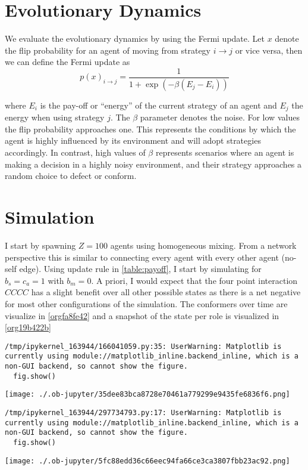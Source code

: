 \documentclass[a4paper, 11pt, twocolumn]{article}
\begin{document}
\section{Evolutionary Dynamics}
\label{sec:orgf5e224b}
We  evaluate the  evolutionary dynamics  by using  the Fermi
update. Let \(x\) denote the  flip probability for an agent of
moving from  strategy \(i  \to j\)  or vice  versa, then  we can
define the Fermi update as
\begin{equation}
\label{fermi-update}
p(x)_{i \to j} = \frac{1}{1 + \exp(-\beta (E_j- E_i))}
\end{equation}

where  \(E_i\)  is the  pay-off  or  ``energy'' of  the  current
strategy  of  an  agent  and \(E_j\)  the  energy  when  using
strategy \(j\). The  \(\beta\) parameter denotes the  noise. For low
values the flip probability  approaches one. This represents
the conditions  by which the  agent is highly  influenced by
its environment  and will  adopt strategies  accordingly. In
contrast, high  values of \(\beta\) represents  scenarios where an
agent is  making a decision  in a highly  noisy environment,
and their strategy  approaches a random choice  to defect or
conform.

\section{Simulation}
\label{sec:orgadedffe}
I  start by  spawning  \(Z =  100\)  agents using  homogeneous
mixing.  From  a  network  perspective this  is  similar  to
connecting  every  agent  with every  other  agent  (no-self
edge).  Using update  rule in  \ref{table:payoff}, I  start by
simulating for \(b_s =  c_a = 1\) with \(b_m =  0\). A priori, I
would expect  that the four  point interaction \(CCCC\)  has a
slight benefit over all other  possible states as there is a
net   negative  for   most  other   configurations  of   the
simulation.  The  conformers  over  time  are  visualize  in
\ref{orgfa8fe42}  and a  snapshot  of the  state  per role  is
visualized in \ref{org19b422b}

\begin{verbatim}
/tmp/ipykernel_163944/166041059.py:35: UserWarning: Matplotlib is currently using module://matplotlib_inline.backend_inline, which is a non-GUI backend, so cannot show the figure.
  fig.show()
\end{verbatim}

\begin{center}
\texttt{[image: ./.ob-jupyter/35dee83bca8728e70461a779299e9435fe6836f6.png]}
\end{center}

\begin{verbatim}
/tmp/ipykernel_163944/297734793.py:17: UserWarning: Matplotlib is currently using module://matplotlib_inline.backend_inline, which is a non-GUI backend, so cannot show the figure.
  fig.show()
\end{verbatim}

\begin{center}
\texttt{[image: ./.ob-jupyter/5fc88edd36c66eec94fa66ce3ca3807fbb23ac92.png]}
\end{center}
\end{document}
